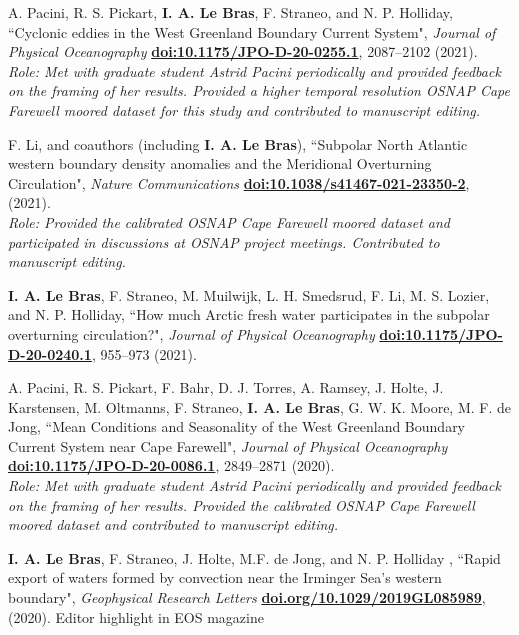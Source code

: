\documentclass[paper=letter,fontsize=11pt]{scrartcl} %
\newcommand{\PaperEntry}[6]{
		\noindent #1, ``#2", \textit{#3} \textbf{#4}, #5 (#6).}
\begin{document}
\begin{etaremune}
\item \PaperEntry{A. Pacini, R. S. Pickart, \textbf{I. A. Le Bras}, F. Straneo, and N. P. Holliday}{Cyclonic eddies in the West Greenland Boundary Current System}{Journal of Physical Oceanography}{\url{doi:10.1175/JPO-D-20-0255.1}}{2087--2102}{2021}\\
\emph{Role: Met with graduate student Astrid Pacini periodically and provided feedback on the framing of her results. Provided a higher temporal resolution OSNAP Cape Farewell moored dataset for this study and contributed to manuscript editing.}


\item \PaperEntry{F. Li, and coauthors (including \textbf{I. A. Le Bras})}{Subpolar North Atlantic western boundary density anomalies and the Meridional Overturning Circulation}{Nature Communications}{\url{doi:10.1038/s41467-021-23350-2}}{}{2021}\\
\emph{Role: Provided the calibrated OSNAP Cape Farewell moored dataset and participated in discussions at OSNAP project meetings. Contributed to manuscript editing.}

\item \PaperEntry{\textbf{I. A. Le Bras}, F. Straneo, M. Muilwijk, L. H. Smedsrud, F. Li, M. S. Lozier, and N. P. Holliday}{How much Arctic fresh water participates in the subpolar overturning circulation?}{Journal of Physical Oceanography}{\url{doi:10.1175/JPO-D-20-0240.1}}{955--973}{2021}

\item \PaperEntry{A. Pacini, R. S. Pickart, F. Bahr, D. J. Torres, A. Ramsey, J. Holte, J. Karstensen, M. Oltmanns, F. Straneo, \textbf{I. A. Le Bras}, G. W. K. Moore, M. F. de Jong}{Mean Conditions and Seasonality of the West Greenland Boundary Current System near Cape Farewell}{Journal of Physical Oceanography}{\url{doi:10.1175/JPO-D-20-0086.1}}{2849--2871}{2020}\\
\emph{Role: Met with graduate student Astrid Pacini periodically and provided feedback on the framing of her results. Provided the calibrated OSNAP Cape Farewell moored dataset and contributed to manuscript editing.}

\item \PaperEntry{\textbf{I. A. Le Bras}, F. Straneo, J. Holte, M.F. de Jong, and N. P. Holliday }{Rapid export of waters formed by convection near the Irminger Sea's western boundary}{Geophysical Research Letters}{\url{doi.org/10.1029/2019GL085989}}{}{2020} Editor highlight in EOS magazine


\end{etaremune}
\end{document}
